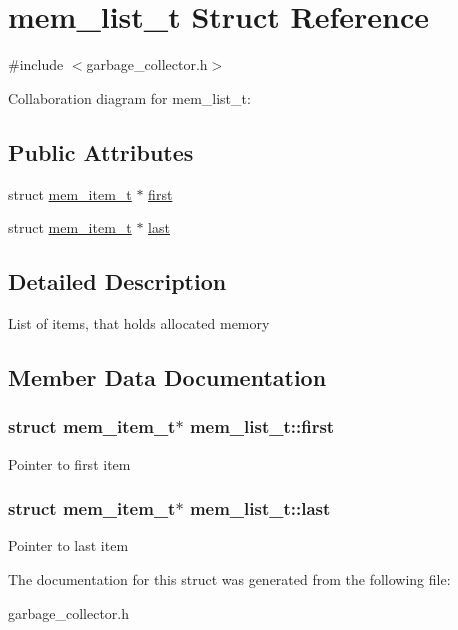 \hypertarget{structmem__list__t}{}\section{mem\+\_\+list\+\_\+t Struct Reference}
\label{structmem__list__t}


{\ttfamily \#include $<$garbage\+\_\+collector.\+h$>$}



Collaboration diagram for mem\+\_\+list\+\_\+t\+:
\subsection*{Public Attributes}
\begin{DoxyCompactItemize}
\item 
struct \hyperlink{structmem__item__t}{mem\+\_\+item\+\_\+t} $\ast$ \hyperlink{structmem__list__t_a660f5ef09ad8cd1d5dcd84a12600b8de}{first}
\item 
struct \hyperlink{structmem__item__t}{mem\+\_\+item\+\_\+t} $\ast$ \hyperlink{structmem__list__t_ad0d6a4567a65701564f45cb8161f675a}{last}
\end{DoxyCompactItemize}


\subsection{Detailed Description}
List of items, that holds allocated memory 

\subsection{Member Data Documentation}
\subsubsection[{\texorpdfstring{first}{first}}]{\setlength{\rightskip}{0pt plus 5cm}struct {\bf mem\+\_\+item\+\_\+t}$\ast$ mem\+\_\+list\+\_\+t\+::first}\hypertarget{structmem__list__t_a660f5ef09ad8cd1d5dcd84a12600b8de}{}\label{structmem__list__t_a660f5ef09ad8cd1d5dcd84a12600b8de}
Pointer to first item 
\subsubsection[{\texorpdfstring{last}{last}}]{\setlength{\rightskip}{0pt plus 5cm}struct {\bf mem\+\_\+item\+\_\+t}$\ast$ mem\+\_\+list\+\_\+t\+::last}\hypertarget{structmem__list__t_ad0d6a4567a65701564f45cb8161f675a}{}\label{structmem__list__t_ad0d6a4567a65701564f45cb8161f675a}
Pointer to last item 

The documentation for this struct was generated from the following file\+:\begin{DoxyCompactItemize}
\item 
garbage\+\_\+collector.\+h\end{DoxyCompactItemize}
